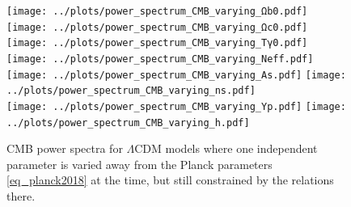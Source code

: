 \documentclass[10pt,a4paper]{article}
\begin{document}
\begin{figure}
\centering
\texttt{[image: ../plots/power\_spectrum\_CMB\_varying\_Ωb0.pdf]} \hfill
\texttt{[image: ../plots/power\_spectrum\_CMB\_varying\_Ωc0.pdf]} \\
\texttt{[image: ../plots/power\_spectrum\_CMB\_varying\_Tγ0.pdf]} \hfill
\texttt{[image: ../plots/power\_spectrum\_CMB\_varying\_Neff.pdf]} \\
\texttt{[image: ../plots/power\_spectrum\_CMB\_varying\_As.pdf]} \hfill
\texttt{[image: ../plots/power\_spectrum\_CMB\_varying\_ns.pdf]} \\
\texttt{[image: ../plots/power\_spectrum\_CMB\_varying\_Yp.pdf]} \hfill
\texttt{[image: ../plots/power\_spectrum\_CMB\_varying\_h.pdf]} \\
\caption{CMB power spectra for $\Lambda$CDM models where one independent parameter is varied away from the Planck parameters \eqref{eq_planck2018} at the time, but still constrained by the relations there.}
\label{fig_power_spectrum_cmb_varying_parameters}
\end{figure}
\end{document}
